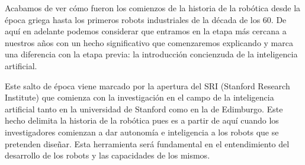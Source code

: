 Acabamos de ver cómo fueron los comienzos de la historia de la robótica desde la época griega hasta los primeros robots industriales de la década de los 60. De aquí en adelante podemos considerar que entramos en la etapa más cercana a nuestros años con un hecho significativo que comenzaremos explicando y marca una diferencia con la etapa previa: la introducción concienzuda de la inteligencia artificial.

Este salto de época viene marcado por la apertura del SRI (Stanford Research Institute) que comienza con la investigación en el campo de la inteligencia artificial tanto en la universidad de Stanford como en la de Edimburgo. Este hecho delimita la historia de la robótica pues es a partir de aquí cuando los investigadores comienzan a dar autonomía e inteligencia a los robots que se pretenden diseñar. Esta herramienta será fundamental en el entendimiento del desarrollo de los robots y las capacidades de los mismos.